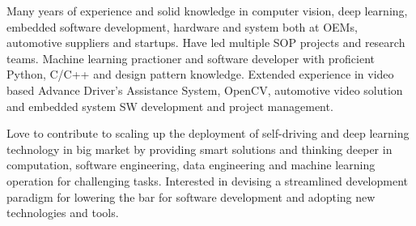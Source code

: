 \documentclass[../resume.tex]{subfiles}
\begin{document}


\begin{cvparagraph}

Many years of experience and solid knowledge in computer vision, deep learning, embedded software development, hardware and system both at OEMs, automotive suppliers and startups. Have led multiple SOP projects and research teams. Machine learning practioner and software developer with proficient Python, C/C++ and design pattern knowledge. Extended experience in video based Advance Driver’s Assistance System, OpenCV, automotive video solution and embedded system SW development and project management.

Love to contribute to scaling up the deployment of self-driving and deep learning technology in big market by providing smart solutions and thinking deeper in computation, software engineering, data engineering and machine learning operation for challenging tasks. Interested in devising a streamlined development paradigm for lowering the bar for software development and adopting new technologies and tools.


\end{cvparagraph}
\end{document}
